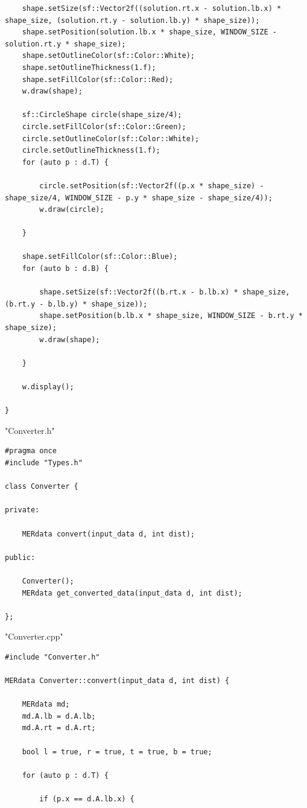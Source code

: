 \documentclass[a4paper,12pt]{article}
\begin{document}
{{{\begin{lstlisting}
	shape.setSize(sf::Vector2f((solution.rt.x - solution.lb.x) * shape_size, (solution.rt.y - solution.lb.y) * shape_size));
	shape.setPosition(solution.lb.x * shape_size, WINDOW_SIZE - solution.rt.y * shape_size);
	shape.setOutlineColor(sf::Color::White);
	shape.setOutlineThickness(1.f);
	shape.setFillColor(sf::Color::Red);
	w.draw(shape);
	
	sf::CircleShape circle(shape_size/4);
	circle.setFillColor(sf::Color::Green);
	circle.setOutlineColor(sf::Color::White);
	circle.setOutlineThickness(1.f);
	for (auto p : d.T) {

		circle.setPosition(sf::Vector2f((p.x * shape_size) - shape_size/4, WINDOW_SIZE - p.y * shape_size - shape_size/4));
		w.draw(circle);

	}

	shape.setFillColor(sf::Color::Blue);
	for (auto b : d.B) {

		shape.setSize(sf::Vector2f((b.rt.x - b.lb.x) * shape_size, (b.rt.y - b.lb.y) * shape_size));
		shape.setPosition(b.lb.x * shape_size, WINDOW_SIZE - b.rt.y * shape_size);
		w.draw(shape);

	}

	w.display();

}
\end{lstlisting}
\newpage
\begin{center}
"Converter.h"
\end{center}
\begin{lstlisting}
#pragma once
#include "Types.h"

class Converter {

private:

	MERdata convert(input_data d, int dist);

public:

	Converter();
	MERdata get_converted_data(input_data d, int dist);
	
};
\end{lstlisting}
\newpage
\begin{center}
"Converter.cpp"
\end{center}
\begin{lstlisting}
#include "Converter.h"

MERdata Converter::convert(input_data d, int dist) {

	MERdata md;
	md.A.lb = d.A.lb;
	md.A.rt = d.A.rt;

	bool l = true, r = true, t = true, b = true;

	for (auto p : d.T) {

		if (p.x == d.A.lb.x) {


\end{lstlisting}}}}
\end{document}
